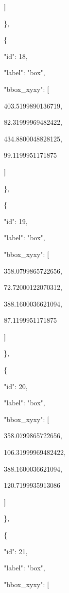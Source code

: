 \documentclass[10pt,a4paper]{article}
\begin{document}
      ]\par
    \},\allowbreak{}\par
    \{\par
      "id":\allowbreak{} 18,\allowbreak{}\par
      "label":\allowbreak{} "box",\allowbreak{}\par
      "bbox\_xyxy":\allowbreak{} [\par
        403.5199890136719,\allowbreak{}\par
        82.31999969482422,\allowbreak{}\par
        434.8800048828125,\allowbreak{}\par
        99.1199951171875\par
      ]\par
    \},\allowbreak{}\par
    \{\par
      "id":\allowbreak{} 19,\allowbreak{}\par
      "label":\allowbreak{} "box",\allowbreak{}\par
      "bbox\_xyxy":\allowbreak{} [\par
        358.0799865722656,\allowbreak{}\par
        72.72000122070312,\allowbreak{}\par
        388.1600036621094,\allowbreak{}\par
        87.1199951171875\par
      ]\par
    \},\allowbreak{}\par
    \{\par
      "id":\allowbreak{} 20,\allowbreak{}\par
      "label":\allowbreak{} "box",\allowbreak{}\par
      "bbox\_xyxy":\allowbreak{} [\par
        358.0799865722656,\allowbreak{}\par
        106.31999969482422,\allowbreak{}\par
        388.1600036621094,\allowbreak{}\par
        120.7199935913086\par
      ]\par
    \},\allowbreak{}\par
    \{\par
      "id":\allowbreak{} 21,\allowbreak{}\par
      "label":\allowbreak{} "box",\allowbreak{}\par
      "bbox\_xyxy":\allowbreak{} [\par
\end{document}
